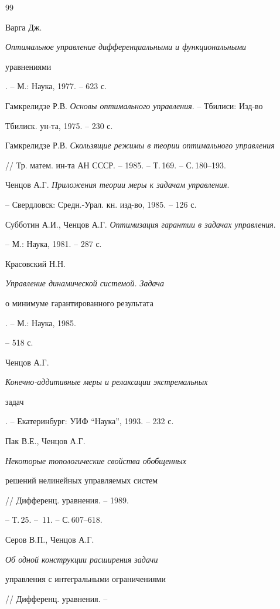\begin{thebibliography}{99}







Варга Дж. {\em Оптимальное управление дифференциальными и функциональными


уравнениями}. -- М.: Наука, 1977. -- 623 с.




Гамкрелидзе Р.В. {\em Основы оптимального управления}. -- Тбилиси: Изд-во


Тбилиск. ун-та, 1975. -- 230 с.




Гамкрелидзе Р.В. {\em Скользящие режимы в теории оптимального управления}


// Тр. матем. ин-та АН СССР. -- 1985. -- Т.\,169. -- С.\,180--193.




Ченцов А.Г. {\em Приложения теории меры к задачам управления}.


-- Свердловск: Средн.-Урал. кн. изд-во, 1985. -- 126 с.




Субботин А.И., Ченцов А.Г. {\em Оптимизация гарантии в задачах управления}.


-- М.: Наука, 1981. -- 287 с.




Красовский Н.Н. {\em Управление динамической системой. Задача


о минимуме гарантированного результата}. -- М.: Наука, 1985.


-- 518 с.




Ченцов А.Г. {\em Конечно-аддитивные меры и релаксации экстремальных


задач}. -- Екатеринбург: УИФ ``Наука'', 1993. -- 232 с.




Пак В.Е., Ченцов А.Г. {\em Некоторые топологические свойства обобщенных


решений нелинейных управляемых систем} // Дифференц. уравнения. -- 1989.


-- Т.\,25. -- \No\,11. -- С.\,607--618.




Серов В.П., Ченцов А.Г. {\em Об одной конструкции расширения задачи


управления с интегральными ограничениями} // Дифференц. уравнения. --



\end{thebibliography}
